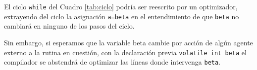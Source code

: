 \begin{ejemplo}
El ciclo \lstinline{while} del Cuadro \ref{tab:ciclo} podría ser reescrito por un optimizador, extrayendo del ciclo la
asignación \lstinline{a=beta} en el entendimiento de que \lstinline{beta} no cambiará en ninguno de los pasos del ciclo.
\begin{comment}
\begin{table}
\centering	
\begin{tabular}{l|l|l}
\hline
Sin optimizar & Optimizado & Optimización inhibida\\
\hline
\begin{codecell}
while(!fin) {
	a = beta;
	b = fun(a);
}
\end{codecell}
&
\begin{codecell}
a = beta;
while(!fin)
	b = fun(a);
\end{codecell}
&
\begin{codecell}
volatile int beta;
while(!fin) {
	a = beta;
	b = fun(a);
}
\end{codecell}
\\
\end{tabular} 
  \caption{Optimización de ciclos}
  \label{tab:ciclo} 
\end{table}
\end{comment}

Sin embargo, si esperamos que la variable beta cambie por acción de algún agente externo a la rutina
en cuestión, con la declaración previa
\lstinline{volatile int beta}
el compilador se abstendrá de optimizar las líneas donde intervenga \lstinline{beta}.
\end{ejemplo}




